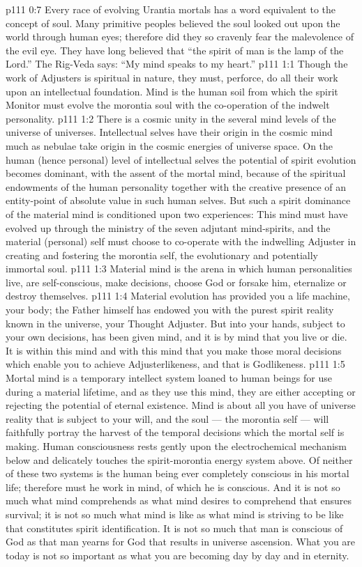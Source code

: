 \vs p111 0:7 Every race of evolving Urantia mortals has a word equivalent to the concept of soul. Many primitive peoples believed the soul looked out upon the world through human eyes; therefore did they so cravenly fear the malevolence of the evil eye. They have long believed that “the spirit of man is the lamp of the Lord.” The Rig\hyp{}Veda says: “My mind speaks to my heart.”
\vs p111 1:1 Though the work of Adjusters is spiritual in nature, they must, perforce, do all their work upon an intellectual foundation. Mind is the human soil from which the spirit Monitor must evolve the morontia soul with the co\hyp{}operation of the indwelt personality.
\vs p111 1:2 There is a cosmic unity in the several mind levels of the universe of universes. Intellectual selves have their origin in the cosmic mind much as nebulae take origin in the cosmic energies of universe space. On the human (hence personal) level of intellectual selves the potential of spirit evolution becomes dominant, with the assent of the mortal mind, because of the spiritual endowments of the human personality together with the creative presence of an entity\hyp{}point of absolute value in such human selves. But such a spirit dominance of the material mind is conditioned upon two experiences: This mind must have evolved up through the ministry of the seven adjutant mind\hyp{}spirits, and the material (personal) self must choose to co\hyp{}operate with the indwelling Adjuster in creating and fostering the morontia self, the evolutionary and potentially immortal soul.
\vs p111 1:3 \pc Material mind is the arena in which human personalities live, are self\hyp{}conscious, make decisions, choose God or forsake him, eternalize or destroy themselves.
\vs p111 1:4 \pc Material evolution has provided you a life machine, your body; the Father himself has endowed you with the purest spirit reality known in the universe, your Thought Adjuster. But into your hands, subject to your own decisions, has been given mind, and it is by mind that you live or die. It is within this mind and with this mind that you make those moral decisions which enable you to achieve Adjusterlikeness, and that is Godlikeness.
\vs p111 1:5 Mortal mind is a temporary intellect system loaned to human beings for use during a material lifetime, and as they use this mind, they are either accepting or rejecting the potential of eternal existence. Mind is about all you have of universe reality that is subject to your will, and the soul --- the morontia self --- will faithfully portray the harvest of the temporal decisions which the mortal self is making. Human consciousness rests gently upon the electrochemical mechanism below and delicately touches the spirit\hyp{}morontia energy system above. Of neither of these two systems is the human being ever completely conscious in his mortal life; therefore must he work in mind, of which he is conscious. And it is not so much what mind comprehends as what mind desires to comprehend that ensures survival; it is not so much what mind is like as what mind is striving to be like that constitutes spirit identification. It is not so much that man is conscious of God as that man yearns for God that results in universe ascension. What you are today is not so important as what you are becoming day by day and in eternity.
